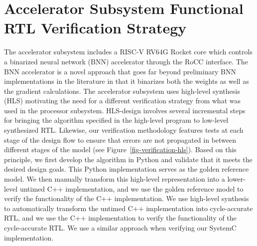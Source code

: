
\section{Accelerator Subsystem Functional RTL Verification Strategy}



The accelerator subsystem includes a RISC-V RV64G Rocket core which
controls a binarized neural network (BNN) accelerator through the RoCC
interface. The BNN accelerator is a novel approach that goes far beyond
preliminary BNN implementations in the literature in that it binarizes
both the weights as well as the gradient calculations. The accelerator
subsystem uses high-level synthesis (HLS) motivating the need for a
different verification strategy from what was used in the processor
subsystem. HLS-design involves several incremental steps for bringing the
algorithm specified in the high-level program to low-level synthesized
RTL. Likewise, our verification methodology features tests at each stage
of the design flow to ensure that errors are not propagated in between
different stages of the model (see Figure~\ref{fig-verification-hls}).
Based on this principle, we first develop the algorithm in Python and
validate that it meets the desired design goals. This Python
implementation serves as the golden reference model. We then manually
transform this high-level representation into a lower-level untimed C++
implementation, and we use the golden reference model to verify the
functionality of the C++ implementation. We use high-level synthesis to
automatically transform the untimed C++ implementation into
cycle-accurate RTL, and we use the C++ implementation to verify the
functionality of the cycle-accurate RTL. We use a similar approach when
verifying our SystemC implementation.


